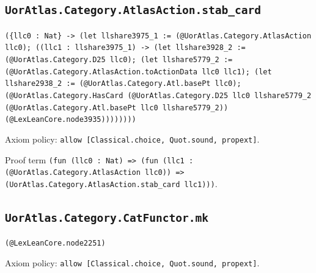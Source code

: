 \documentclass[11pt]{article}
\begin{document}
\subsection*{\texttt{UorAtlas.Category.AtlasAction.stab\_card}}
\noindent\texttt{(\{llc0 : Nat\} -> (let llshare3975\_1 := (@UorAtlas.Category.AtlasAction llc0); ((llc1 : llshare3975\_1) -> (let llshare3928\_2 := (@UorAtlas.Category.D25 llc0); (let llshare5779\_2 := (@UorAtlas.Category.AtlasAction.toActionData llc0 llc1); (let llshare2938\_2 := (@UorAtlas.Category.Atl.basePt llc0); (@UorAtlas.Category.HasCard (@UorAtlas.Category.D25 llc0 llshare5779\_2 (@UorAtlas.Category.Atl.basePt llc0 llshare5779\_2)) (@LexLeanCore.node3935))))))))}\par
\noindent Axiom policy: \texttt{allow [Classical.choice, Quot.sound, propext]}.\par
\noindent Proof term \texttt{(fun (llc0 : Nat) => (fun (llc1 : (@UorAtlas.Category.AtlasAction llc0)) => (UorAtlas.Category.AtlasAction.stab\_card llc1)))}.\par
\subsection*{\texttt{UorAtlas.Category.CatFunctor.mk}}
\noindent\texttt{(@LexLeanCore.node2251)}\par
\noindent Axiom policy: \texttt{allow [Classical.choice, Quot.sound, propext]}.\par
\end{document}
